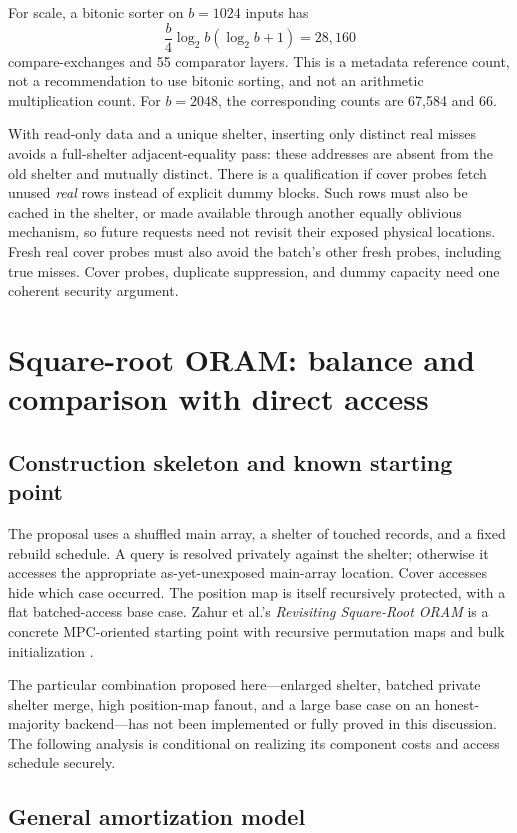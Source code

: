 \documentclass[11pt]{article}
\begin{document}
For scale, a bitonic sorter on $b=1024$ inputs has
\[
\frac{b}{4}\log_2 b(\log_2 b+1)=28{,}160
\]
compare-exchanges and 55 comparator layers. This is a metadata reference count,
not a recommendation to use bitonic sorting, and not an arithmetic multiplication
count. For $b=2048$, the corresponding counts are 67,584 and 66.

With read-only data and a unique shelter, inserting only distinct real misses
avoids a full-shelter adjacent-equality pass: these addresses are absent from
the old shelter and mutually distinct. There is a qualification if cover probes
fetch unused \emph{real} rows instead of explicit dummy blocks. Such rows must
also be cached in the shelter, or made available through another equally
oblivious mechanism, so future requests need not revisit their exposed physical
locations. Fresh real cover probes must also avoid the batch's other fresh
probes, including true misses. Cover probes, duplicate suppression, and
dummy capacity need one coherent security argument.

\section{Square-root ORAM: balance and comparison with direct access}\label{sec:sqrt}

\subsection{Construction skeleton and known starting point}

The proposal uses a shuffled main array, a shelter of touched records, and a
fixed rebuild schedule. A query is resolved privately against the shelter;
otherwise it accesses the appropriate as-yet-unexposed main-array location.
Cover accesses hide which case occurred. The position map is itself recursively
protected, with a flat batched-access base case. Zahur et al.'s
\emph{Revisiting Square-Root ORAM} is a concrete MPC-oriented starting point
with recursive permutation maps and bulk initialization \cite{zahur2016}.

The particular combination proposed here---enlarged shelter, batched private
shelter merge, high position-map fanout, and a large base case on an
honest-majority backend---has not been implemented or fully proved in this
discussion. The following analysis is conditional on realizing its component
costs and access schedule securely.

\subsection{General amortization model}
\end{document}
